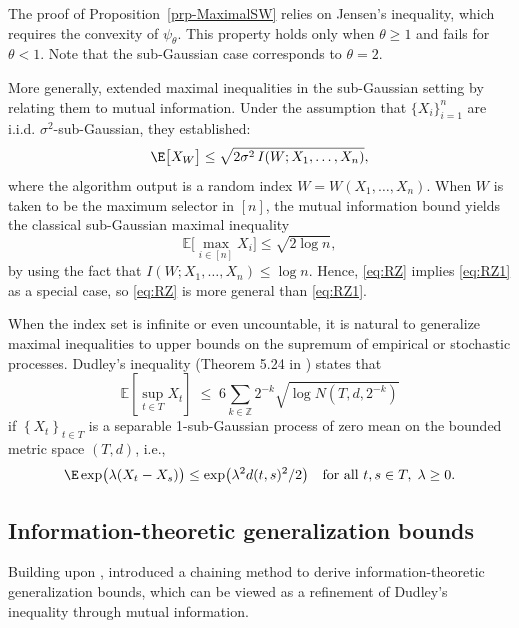 \documentclass[11pt]{article}
\begin{document}
The proof of Proposition~\ref{prp-MaximalSW} relies on Jensen's inequality, which requires the convexity of $\psi_\theta$. This property holds only when $\theta \ge 1$ and fails for $\theta<1$. Note that the sub-Gaussian case corresponds to $\theta = 2$. 

More generally, \citet{Russo20} extended maximal inequalities in the sub-Gaussian setting by relating them to mutual information. Under the assumption that $\{X_{i}\}_{i=1}^n$ are i.i.d. $\sigma^2$-sub-Gaussian, they established:
\begin{equation}\label{eq:RZ}
    \E \bigl[ X_W \bigr] \leq \sqrt{2\sigma^2\, I(W;X_1, \ldots, X_n)},
\end{equation}
where the algorithm output is a random index $W = W(X_1, \ldots, X_n)$. When $W$ is taken to be the maximum selector in $[n]$, the mutual information bound yields the classical sub-Gaussian maximal inequality
\begin{equation}\label{eq:RZ1}
\mathbb{E}\bigl[\max_{ i \in [n]} X_i\bigr] \leq \sqrt{2 \log n},
\end{equation}
by using the fact that $I(W;X_1, \ldots, X_n)\le \log n$. Hence, \eqref{eq:RZ} implies \eqref{eq:RZ1} as a special case, so \eqref{eq:RZ} is more general than \eqref{eq:RZ1}.

When the index set is infinite or even uncountable, it is natural to generalize maximal inequalities to upper bounds on the supremum of empirical or stochastic processes. Dudley's inequality (Theorem 5.24 in \cite{vanhandle2016probability}) states that
\[
\mathbb{E}\left[\sup _{t \in T} X_t\right] 
\;\leq\; 6 \sum_{k \in \mathbb{Z}} 2^{-k} \sqrt{\log N\left(T, d, 2^{-k}\right)}
\]
if $\left\{X_t\right\}_{t \in T}$ is a separable 1-sub-Gaussian process of zero mean on the bounded metric space $(T, d)$, i.e.,
\[
\E \exp\bigl(\lambda(X_t-X_s)\bigr) \leq \exp\bigl(\lambda^2 d(t, s)^2 / 2\bigr)
\quad \text{for all}~t, s \in T,\; \lambda \geq 0.
\]



\subsection{Information-theoretic generalization bounds}


Building upon \citet{Russo20}, \citet{asadi2018chaining} introduced a chaining method to derive information-theoretic generalization bounds, which can be viewed as a refinement of Dudley's inequality through mutual information.
\end{document}
